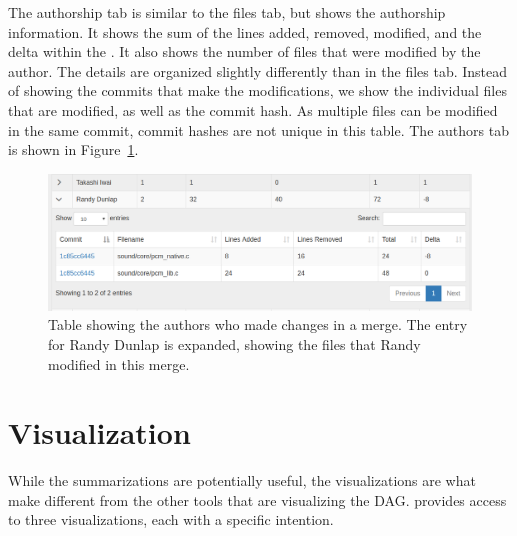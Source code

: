 The authorship tab is similar to the files tab, but shows the authorship
information. It shows the sum of the lines added, removed, modified, and
the delta within the \mt{}. It also shows the number of files that were
modified by the author. The details are organized slightly differently
than in the files tab. Instead of showing the commits that make the
modifications, we show the individual files that are modified, as well
as the commit hash. As multiple files can be modified in the same
commit, commit hashes are not unique in this table. The authors tab is
shown in Figure~\ref{fig:linvis_authors_results}.

\begin{figure}[htpb]
  \centering
  \includegraphics[width=0.9\linewidth]{Figures/Linvis/linvis_authors.png}
  \caption{Table showing the authors who made changes in a merge. The
    entry for Randy Dunlap is expanded, showing the files that Randy
    modified in this merge.}
  \label{fig:linvis_authors_results}
\end{figure}

\section{Visualization}\label{sec:visualization}

While the summarizations are potentially useful, the visualizations are
what make \tool{} different from the other tools that are visualizing
the DAG\@. \tool{} provides access to three visualizations, each with a
specific intention.
